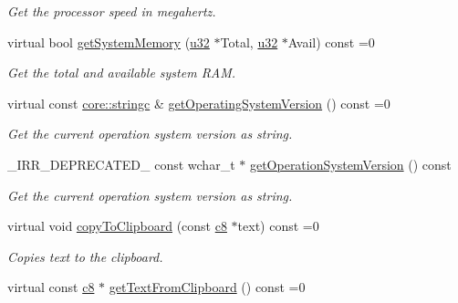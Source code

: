 \begin{DoxyCompactItemize}
\begin{DoxyCompactList}\small\item\em Get the processor speed in megahertz. \end{DoxyCompactList}\item 
virtual bool \hyperlink{classirr_1_1IOSOperator_af58b50cecf28f247e1f302ee0b9e8270}{get\+System\+Memory} (\hyperlink{namespaceirr_a0416a53257075833e7002efd0a18e804}{u32} $\ast$Total, \hyperlink{namespaceirr_a0416a53257075833e7002efd0a18e804}{u32} $\ast$Avail) const =0
\begin{DoxyCompactList}\small\item\em Get the total and available system R\+AM. \end{DoxyCompactList}\item 
\mbox{\label{classirr_1_1IOSOperator_acf89b7715468ad2af91807dea6d40bf8}} 
virtual const \hyperlink{namespaceirr_1_1core_ab26a0e0359206b5a694f35c37c829d7f}{core\+::stringc} \& \hyperlink{classirr_1_1IOSOperator_acf89b7715468ad2af91807dea6d40bf8}{get\+Operating\+System\+Version} () const =0
\begin{DoxyCompactList}\small\item\em Get the current operation system version as string. \end{DoxyCompactList}\item 
\+\_\+\+I\+R\+R\+\_\+\+D\+E\+P\+R\+E\+C\+A\+T\+E\+D\+\_\+ const wchar\+\_\+t $\ast$ \hyperlink{classirr_1_1IOSOperator_a8d634ee79439742b7397ca7ad7a3812a}{get\+Operation\+System\+Version} () const
\begin{DoxyCompactList}\small\item\em Get the current operation system version as string. \end{DoxyCompactList}\item 
\mbox{\label{classirr_1_1IOSOperator_aba3b621ed3b64e5a421c42b06b49e0b6}} 
virtual void \hyperlink{classirr_1_1IOSOperator_aba3b621ed3b64e5a421c42b06b49e0b6}{copy\+To\+Clipboard} (const \hyperlink{namespaceirr_a9395eaea339bcb546b319e9c96bf7410}{c8} $\ast$text) const =0
\begin{DoxyCompactList}\small\item\em Copies text to the clipboard. \end{DoxyCompactList}\item 
virtual const \hyperlink{namespaceirr_a9395eaea339bcb546b319e9c96bf7410}{c8} $\ast$ \hyperlink{classirr_1_1IOSOperator_a9026ff9f28b48615971e18fcee6fff4c}{get\+Text\+From\+Clipboard} () const =0

\end{DoxyCompactItemize}
